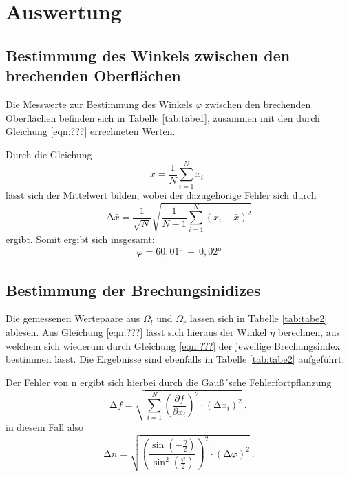 \section{Auswertung}
\label{sec:Auswertung}
\subsection{Bestimmung des Winkels zwischen den brechenden Oberflächen}

Die Messwerte zur Bestimmung des Winkels $\varphi$ zwischen den brechenden Oberflächen befinden sich
in Tabelle \ref{tab:tabe1},
zusammen mit den durch Gleichung \ref{eqn:???} errechneten Werten.


Durch die Gleichung
\begin{equation}
  \bar{x} = \frac{1}{N} \sum_{i=1}^{N} x_i \: \:
  \label{eqn:mit}
\end{equation}
\noindent lässt sich der Mittelwert bilden, wobei der dazugehörige Fehler sich durch
\begin{equation}
  \increment \bar{x} = \frac{1}{\sqrt{N}} \sqrt{ \frac{1}{N-1} \sum_{i=1}^N
  (x_i - \bar{x})^2}
  \label{eqn:mitf}
\end{equation}
ergibt. Somit ergibt sich insgesamt:
\begin{align*}
  \varphi = 60,01° \: \pm \: 0,02 °
\end{align*}
\subsection{Bestimmung der Brechungsinidizes}
Die gemessenen Wertepaare aus $\Omega_{l}$ und $\Omega_{r}$ lassen sich in Tabelle \ref{tab:tabe2}
ablesen. Aus Gleichung \ref{eqn:???} lässt sich hieraus der Winkel $\eta$ berechnen, aus welchem sich
wiederum durch Gleichung \ref{eqn:???} der jeweilige Brechungsindex bestimmen lässt.
Die Ergebnisse sind ebenfalls in Tabelle \ref{tab:tabe2} aufgeführt.

Der Fehler von n ergibt sich hierbei durch die Gauß´sche Fehlerfortpflanzung
\begin{equation}
  \increment f = \sqrt{ \sum_{i=1}^N \left( \frac{\partial f}{\partial x_i}\right)^2
  \cdot (\increment x_i)^2  } \: ,
  \label{eqn:gaus}
\end{equation}
in diesem Fall also
\begin{equation}
  \increment n = \sqrt{ \left( \frac{ \sin(-\frac{\eta}{2})}{\sin^2(\frac{\varphi}{2})} \right)^2
  \cdot (\increment \varphi)^2 } \: .
\end{equation}

